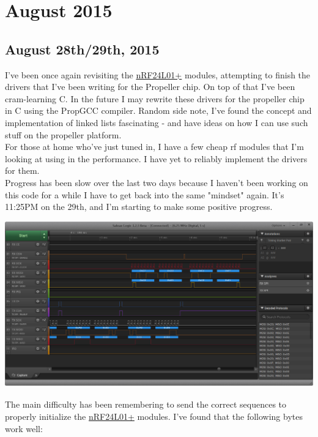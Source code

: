 \chapter{August 2015}
        \section{August 28th/29th, 2015}
    		I've been once again revisiting the \hyperref[sec:nRF24L01+]{nRF24L01+} modules, attempting to finish the drivers that I've been writing for the Propeller chip. On top of that I've been cram-learning C. In the future I may rewrite these drivers for the propeller chip in C using the PropGCC compiler. Random side note, I've found the concept and implementation of linked lists fascinating - and have ideas on how I can use such stuff on the propeller platform.\\
    		
    		For those at home who've just tuned in, I have a few cheap rf modules that I'm looking at using in the performance. I have yet to reliably implement the drivers for them.\\
    		
    		Progress has been slow over the last two days because I haven't been working on this code for a while I have to get back into the same "mindset" again. It's 11:25PM on the 29th, and I'm starting to make some positive progress.\\
    		
    		\centerline{\includegraphics[width=0.75\linewidth]{images/nRF_SPI}}
    		\vspace{10pt}
    			
    		The main difficulty has been remembering to send the correct  sequences to properly initialize the \hyperref[sec:nRF24L01+]{nRF24L01+} modules. I've found that the following bytes work well:\\
    		
